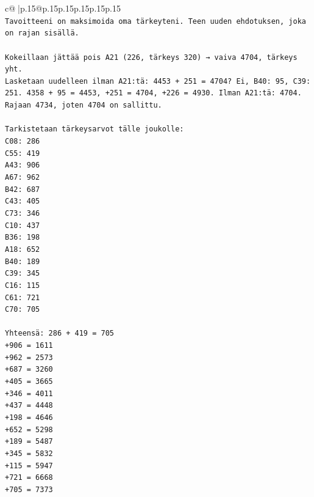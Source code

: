\documentclass{article}
\begin{document}
{\begin{supertabular}{c@{$\;$}|p{.15\linewidth}@{}p{.15\linewidth}p{.15\linewidth}p{.15\linewidth}p{.15\linewidth}p{.15\linewidth}}
{{{\\ 
\texttt{Tavoitteeni on maksimoida oma tärkeyteni. Teen uuden ehdotuksen, joka on rajan sisällä.} \\
\\ 
\texttt{Kokeillaan jättää pois A21 (226, tärkeys 320) → vaiva 4704, tärkeys yht.} \\
\texttt{Lasketaan uudelleen ilman A21:tä: 4453 + 251 = 4704? Ei, B40: 95, C39: 251. 4358 + 95 = 4453, +251 = 4704, +226 = 4930. Ilman A21:tä: 4704. Rajaan 4734, joten 4704 on sallittu.} \\
\\ 
\texttt{Tarkistetaan tärkeysarvot tälle joukolle:} \\
\texttt{C08: 286} \\
\texttt{C55: 419} \\
\texttt{A43: 906} \\
\texttt{A67: 962} \\
\texttt{B42: 687} \\
\texttt{C43: 405} \\
\texttt{C73: 346} \\
\texttt{C10: 437} \\
\texttt{B36: 198} \\
\texttt{A18: 652} \\
\texttt{B40: 189} \\
\texttt{C39: 345} \\
\texttt{C16: 115} \\
\texttt{C61: 721} \\
\texttt{C70: 705} \\
\\ 
\texttt{Yhteensä: 286 + 419 = 705} \\
\texttt{+906 = 1611} \\
\texttt{+962 = 2573} \\
\texttt{+687 = 3260} \\
\texttt{+405 = 3665} \\
\texttt{+346 = 4011} \\
\texttt{+437 = 4448} \\
\texttt{+198 = 4646} \\
\texttt{+652 = 5298} \\
\texttt{+189 = 5487} \\
\texttt{+345 = 5832} \\
\texttt{+115 = 5947} \\
\texttt{+721 = 6668} \\
\texttt{+705 = 7373} \\
\\ 
}}}
\end{supertabular}}
\end{document}
